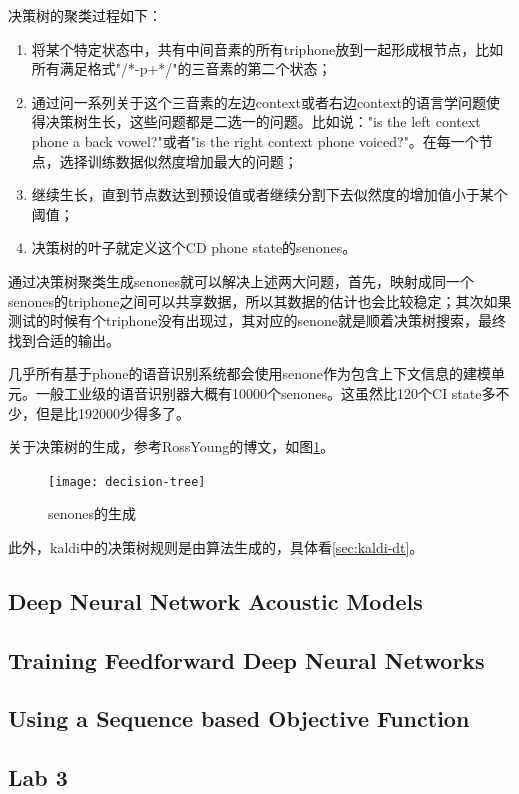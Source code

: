 决策树的聚类过程如下：
\begin{enumerate}
  \item 将某个特定状态中，共有中间音素的所有triphone放到一起形成根节点，比如所有满足格式"/*-p+*/"的三音素的第二个状态；
  \item 通过问一系列关于这个三音素的左边context或者右边context的语言学问题使得决策树生长，这些问题都是二选一的问题。比如说："is the left context phone a back vowel?"或者"is the right context phone voiced?"。在每一个节点，选择训练数据似然度增加最大的问题；
  \item 继续生长，直到节点数达到预设值或者继续分割下去似然度的增加值小于某个阈值；
  \item 决策树的叶子就定义这个CD phone state的senones。
\end{enumerate}

通过决策树聚类生成senones就可以解决上述两大问题，首先，映射成同一个senones的triphone之间可以共享数据，所以其数据的估计也会比较稳定；其次如果测试的时候有个triphone没有出现过，其对应的senone就是顺着决策树搜索，最终找到合适的输出。


几乎所有基于phone的语音识别系统都会使用senone作为包含上下文信息的建模单元。一般工业级的语音识别器大概有10000个senones。这虽然比120个CI state多不少，但是比192000少得多了。

关于决策树的生成，参考RossYoung的博文，如图\ref{fig:decision-tree}。
\begin{figure}[htbp]
  \centering
  \texttt{[image: decision-tree]}
  \caption{senones的生成\label{fig:decision-tree}}
\end{figure}

此外，kaldi中的决策树规则是由算法生成的，具体看\ref{sec:kaldi-dt}。

\subsection{Deep Neural Network Acoustic Models} 

\subsection{Training Feedforward Deep Neural Networks} 

\subsection{Using a Sequence based Objective Function} 

\subsection{Lab 3}


